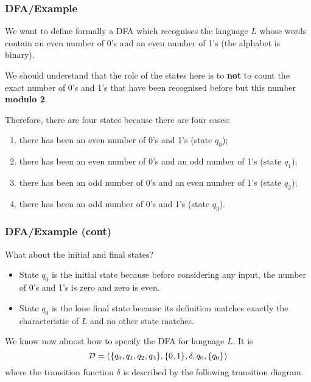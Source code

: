 % 
\begin{frame}
\frametitle{DFA/Example}

We want to define formally a DFA which recognises the language \(L\)
whose words contain an even number of 0's and an even number of 1's
(the alphabet is binary).

\bigskip

We should understand that the role of the states here is to
\textbf{not} to count the exact number of 0's and 1's that have been
recognised before but this number \textbf{modulo 2}.

\bigskip

Therefore, there are four states because there are four cases:
\begin{enumerate}

  \item there has been an even number of 0's and 1's (state \(q_0\));

  \item there has been an even number of 0's and an odd number of 1's
    (state \(q_1\));

  \item there has been an odd number of 0's and an even number of 1's
    (state \(q_2\));

  \item there has been an odd number of 0's and 1's (state \(q_3\)).

\end{enumerate}

\end{frame}

% 
\begin{frame}
\frametitle{DFA/Example (cont)}

What about the initial and final states?
\begin{itemize}

  \item State \(q_0\) is the initial state because before considering
  any input, the number of 0's and 1's is zero and zero is even.

  \item State \(q_0\) is the lone final state because its definition
  matches exactly the characteristic of \(L\) and no other state
  matches.

\end{itemize}
We know now almost how to specify the DFA for language \(L\). It is
\[
{\cal D} = (\{q_0,q_1,q_2,q_3\}, \{0,1\}, \delta,q_0, \{q_0\})
\]
where the transition function \(\delta\) is described by the following
transition diagram.

\end{frame}

